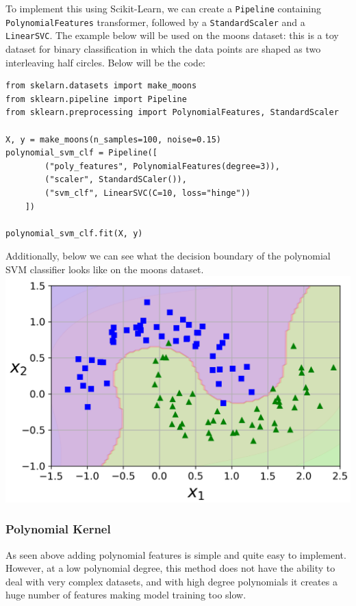 \noindent
To implement this using Scikit-Learn, we can create a \texttt{Pipeline} containing \texttt{PolynomialFeatures}
transformer, followed by a \texttt{StandardScaler} and a \texttt{LinearSVC}. The example below will be used 
on the moons dataset: this is a toy dataset for binary classification in which the data points are shaped as two interleaving 
half circles. Below will be the code:

\begin{verbatim}
from skelarn.datasets import make_moons
from sklearn.pipeline import Pipeline
from sklearn.preprocessing import PolynomialFeatures, StandardScaler

X, y = make_moons(n_samples=100, noise=0.15)
polynomial_svm_clf = Pipeline([
        ("poly_features", PolynomialFeatures(degree=3)),
        ("scaler", StandardSCaler()),
        ("svm_clf", LinearSVC(C=10, loss="hinge"))
    ])

polynomial_svm_clf.fit(X, y)
\end{verbatim}

\noindent
Additionally, below we can see what the decision boundary of the polynomial SVM classifier looks like on the moons dataset.\\

\includegraphics[scale=0.4]{Images/nonlinearSVM.PNG}

\subsubsection{Polynomial Kernel}

As seen above adding polynomial features is simple and quite easy to implement. However, at a low polynomial degree, this method does
not have the ability to deal with very complex datasets, and with high degree polynomials it creates a huge number of features 
making model training too slow. \\

